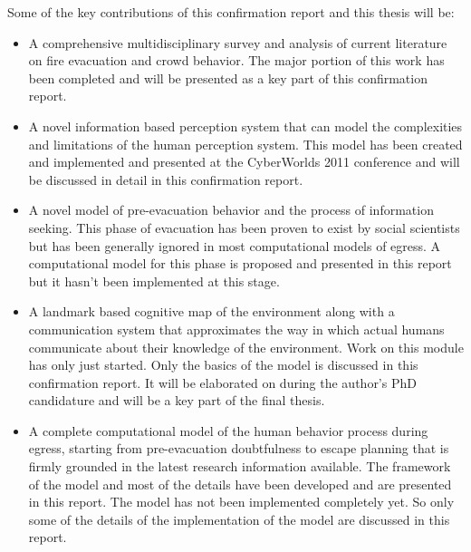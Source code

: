 Some of the key contributions of this confirmation report and this thesis will be:
\begin{itemize}
	\item A comprehensive multidisciplinary survey and analysis of current literature on fire evacuation and crowd behavior. The major portion of this work has been completed and will be presented as a key part of this confirmation report.

	\item A novel information based perception system that can model the complexities and limitations of the human perception system. This model has been created and implemented and presented at the CyberWorlds 2011 conference and will be discussed in detail in this confirmation report.

	\item A novel model of pre-evacuation behavior and the process of information seeking. This phase of evacuation has been proven to exist by social scientists but has been generally ignored in most computational models of egress. A computational model for this phase is proposed and presented in this report but it hasn't been implemented at this stage.

	\item A landmark based cognitive map of the environment along with a communication system that approximates the way in which actual humans communicate about their knowledge of the environment. Work on this module has only just started. Only the basics of the model is discussed in this confirmation report. It will be elaborated on during the author's PhD candidature and will be a key part of the final thesis.

	\item A complete computational model of the human behavior process during egress, starting from pre-evacuation doubtfulness to escape planning that is firmly grounded in the latest research information available. The framework of the model and most of the details have been developed and are presented in this report. The model has not been implemented completely yet. So only some of the details of the implementation of the model are discussed in this report.
\end{itemize}


